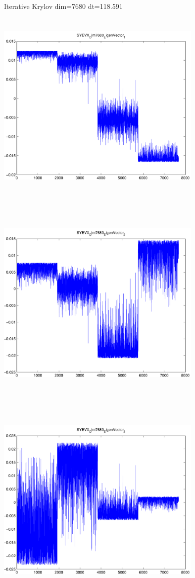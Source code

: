 \documentclass[9pt]{article}
\theoremstyle{plain}
\theoremstyle{definition}
\theoremstyle{remark}
\numberwithin{equation}{section}
\begin{document}
Iterative Krylov dim=7680 dt=118.591
\includegraphics[width=10.0cm,height=10.0cm]{SYEVX_Dim7680_EigenVector_1.pdf}

\includegraphics[width=10.0cm,height=10.0cm]{SYEVX_Dim7680_EigenVector_2.pdf}

\includegraphics[width=10.0cm,height=10.0cm]{SYEVX_Dim7680_EigenVector_3.pdf}
\end{document}
